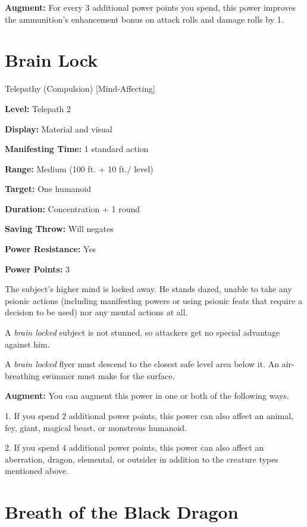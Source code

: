 \documentclass{article}
\begin{document}
\textbf{Augment:} For every 3 additional power points you spend, this power improves 
the ammunition's enhancement bonus on attack rolls and damage rolls by 1.

\vspace{12pt}
\section*{Brain Lock}

Telepathy (Compulsion) [Mind-Affecting]

\textbf{Level:} Telepath 2

\textbf{Display:} Material and visual

\textbf{Manifesting Time:} 1 standard action

\textbf{Range:} Medium (100 ft. + 10 ft./ level)

\textbf{Target:} One humanoid

\textbf{Duration:} Concentration + 1 round

\textbf{Saving Throw:} Will negates

\textbf{Power Resistance:} Yes

\textbf{Power Points:} 3

The subject's higher mind is locked away. He stands dazed, unable to take any psionic 
actions (including manifesting powers or using psionic feats that require a decision 
to be used) nor any mental actions at all.

A \textit{brain locked }subject is not stunned, so attackers get no special advantage 
against him.

A \textit{brain locked }flyer must descend to the closest safe level area below 
it. An air-breathing swimmer must make for the surface.

\textbf{Augment:} You can augment this power in one or both of the following ways.

1. If you spend 2 additional power points, this power can also affect an animal, 
fey, giant, magical beast, or monstrous humanoid.

2. If you spend 4 additional power points, this power can also affect an aberration, 
dragon, elemental, or outsider in addition to the creature types mentioned above.

\vspace{12pt}
\section*{Breath of the Black Dragon}
\end{document}
